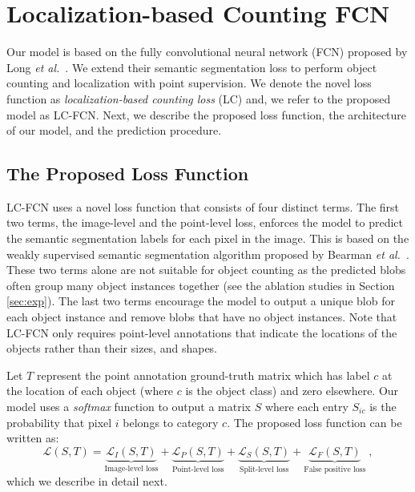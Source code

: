 \documentclass[runningheads]{llncs}
\begin{document}
\section{Localization-based Counting FCN}
\label{sec:loss}

Our model is based on the fully convolutional neural network (FCN) proposed by Long \emph{et al.}~\cite{long2015fully}. We extend their semantic segmentation loss to perform object counting and localization with point supervision. We denote the novel loss function as \emph{localization-based counting loss} (LC) and, we refer to the proposed model as LC-FCN. Next, we describe the proposed loss function, the architecture of our model, and the prediction procedure.



\subsection{The Proposed Loss Function}
LC-FCN uses a novel loss function that consists of four distinct terms. The first two terms, the image-level and the point-level loss, enforces the model to predict the semantic segmentation labels for each pixel in the image. This is based on the weakly supervised semantic segmentation algorithm proposed by Bearman \emph{et al.}~\cite{bearman2016s}. These two terms alone are not suitable for object counting as the predicted blobs often group many object instances together (see the ablation studies in Section \ref{sec:exp}). The last two terms encourage the model to output a unique blob for each object instance and remove blobs that have no object instances. Note that LC-FCN only requires point-level annotations that indicate the locations of the objects rather than their sizes, and shapes.


Let $T$ represent the point annotation ground-truth matrix which has label $c$ at the location of each object (where $c$ is the object class) and zero elsewhere. Our model uses a  \emph{softmax} function to output a matrix $S$ where each entry $S_{ic}$ is the probability that pixel $i$ belongs to category $c$. The proposed loss function can be written as:
\begin{equation}
\mathcal{L}(S, T) = \underbrace{\mathcal{L}_I(S,T)}_{\text{Image-level loss}} + \underbrace{\mathcal{L}_P(S,T)}_{\text{Point-level loss}} + \underbrace{\mathcal{L}_S(S,T)}_{\text{Split-level loss}} + \underbrace{\mathcal{L}_F(S,T)}_{\text{False positive loss}}\;,
\label{eq:loss}
\end{equation}
which we describe in detail next.
\end{document}
